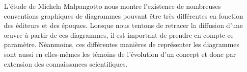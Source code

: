 L'étude de Michela Malpangotto nous montre l'existence de nombreuses conventions graphiques de diagrammes pouvant être très différentes en fonction des éditeurs et des époques. Lorsque nous tentons de retracer la diffusion d'une œuvre à partir de ces diagrammes, il est important de prendre en compte ce paramètre. Néanmoins, ces différentes manières de représenter les diagrammes sont aussi en elles-mêmes les témoins de l'évolution d'un concept et donc par extension des connaissances scientifiques.
